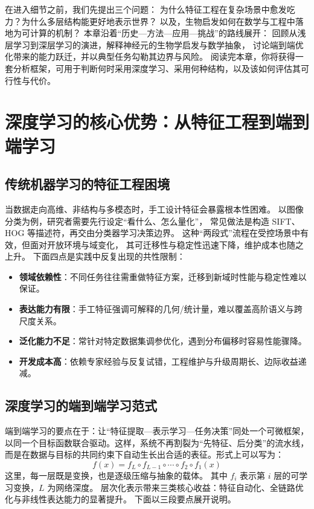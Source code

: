 在进入细节之前，我们先提出三个问题：  
为什么特征工程在复杂场景中愈发吃力？为什么多层结构能更好地表示世界？  
以及，生物启发如何在数学与工程中落地为可计算的机制？  
本章沿着“历史—方法—应用—挑战”的路线展开：  
回顾从浅层学习到深层学习的演进，解释神经元的生物学启发与数学抽象，  
讨论端到端优化带来的能力跃迁，并以典型任务勾勒其边界与风险。  
阅读完本章，你将获得一套分析框架，可用于判断何时采用深度学习、采用何种结构，以及该如何评估其可行性与代价。

\section{深度学习的核心优势：从特征工程到端到端学习}

\subsection{传统机器学习的特征工程困境}

当数据走向高维、非结构与多模态时，手工设计特征会暴露根本性困难。  
以图像分类为例，研究者需要先行设定“看什么、怎么量化”，  
常见做法是构造 SIFT、HOG 等描述符，再交由分类器学习决策边界。  
这种“两段式”流程在受控场景中有效，但面对开放环境与域变化，  
其可迁移性与稳定性迅速下降，维护成本也随之上升。  
下面四点是实践中反复出现的共性限制：

\begin{itemize}
\item {\bf 领域依赖性}：不同任务往往需重做特征方案，迁移到新域时性能与稳定性难以保证。
\item {\bf 表达能力有限}：手工特征强调可解释的几何/统计量，难以覆盖高阶语义与跨尺度关系。
\item {\bf 泛化能力不足}：常针对特定数据集调参优化，遇到分布偏移时容易性能骤降。
\item {\bf 开发成本高}：依赖专家经验与反复试错，工程维护与升级周期长、边际收益递减。
\end{itemize}

\subsection{深度学习的端到端学习范式}

端到端学习的要点在于：让“特征提取—表示学习—任务决策”同处一个可微框架，  
以同一个目标函数联合驱动。这样，系统不再割裂为“先特征、后分类”的流水线，  
而是在数据与目标的共同约束下自动生长出合适的表征。形式上可以写为：
\begin{equation}
f(x) = f_L \circ f_{L-1} \circ \cdots \circ f_2 \circ f_1(x)
\end{equation}
这里，每一层既是变换，也是逐级压缩与抽象的载体。  
其中 $f_i$ 表示第 $i$ 层的可学习变换，$L$ 为网络深度。  
层次化表示带来三类核心收益：特征自动化、全链路优化与非线性表达能力的显著提升。  
下面以三段要点展开说明。

